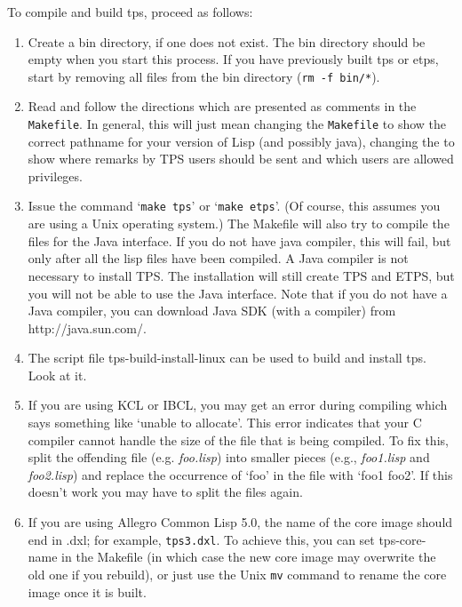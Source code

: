 To compile and build tps, proceed as follows:
\begin{enumerate}

\item Create a bin directory, if one does not exist.
The bin directory should be empty when you start this process.
If you have previously built tps or etps, start by removing
all files from the bin directory ({\tt rm -f bin/*}).

\item Read and follow the directions which are presented as comments in the
{\tt Makefile}. In general, this will just mean
changing the {\tt Makefile}
to show the correct pathname for your
version of Lisp (and possibly java), changing the  to show where remarks by
TPS users should be sent and which users are allowed privileges.

\item Issue the command `{\tt make tps}' or `{\tt make etps}'.
(Of course, this assumes you are using a Unix operating system.)
The Makefile will also try to compile the files for the Java interface.
If you do not have java compiler, this will fail, but only after
all the lisp files have been compiled.
A Java compiler is not necessary to install TPS.  The installation
will still create TPS and ETPS, but you will not be able to use the
Java interface.
Note that if you do not have a Java compiler, you can download
Java SDK (with a compiler) from http://java.sun.com/.

\item The script file tps-build-install-linux can be used to
build and install tps.  Look at it.

\item If you are using KCL or IBCL, you may get an error during compiling
which says something like `unable to allocate'.  This error indicates
that your C compiler cannot handle the size of the file that is
being compiled.  To fix this, split the offending file (e.g. {\it foo.lisp})
into smaller pieces (e.g., {\it foo1.lisp} and {\it foo2.lisp}) and replace
the occurrence of `foo' in the file  with `foo1 foo2'.
If this doesn't work you may have to split the files again.

\item If you are using Allegro Common Lisp 5.0, the name of the core image should
end in .dxl; for example, {\tt tps3.dxl}. To achieve this, you can set tps-core-name
in the Makefile (in which case the new core image may overwrite the old one if
you rebuild), or just use the Unix {\tt mv} command to rename the core image
once it is built.


\end{enumerate}
